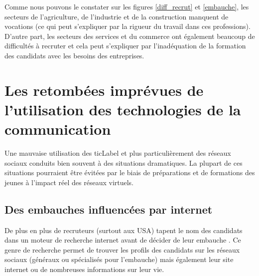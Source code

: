 Comme nous pouvons le constater sur les figures \ref{diff_recrut} et \ref{embauche}, les secteurs de l'agriculture, de l'industrie et de la construction manquent de vocations (ce qui peut s'expliquer par la rigueur du travail dans ces professions). D'autre part, les secteurs des services et du commerce ont également beaucoup de difficultés à recruter et cela peut s'expliquer par l'inadéquation de la formation des candidats avec les besoins des entreprises.


\chapter{Les retombées imprévues de l'utilisation des technologies de la communication}
Une mauvaise utilisation des \gls{ticLabel} et plus particulièrement des réseaux sociaux conduits bien souvent à des situations dramatiques. La plupart de ces situations pourraient être évitées par le biais de préparations et de formations des jeunes à l'impact réel des réseaux virtuels.

\section{Des embauches influencées par internet}
De plus en plus de recruteurs (surtout aux USA) tapent le nom des candidats dans un moteur de recherche internet avant de décider de leur embauche \cite{recrutement_internet, recrut_social_network, social_recrut}. Ce genre de recherche permet de trouver les profils des candidats sur les réseaux sociaux (généraux ou spécialisés pour l'embauche) mais également leur site internet ou de nombreuses informations sur leur vie.

